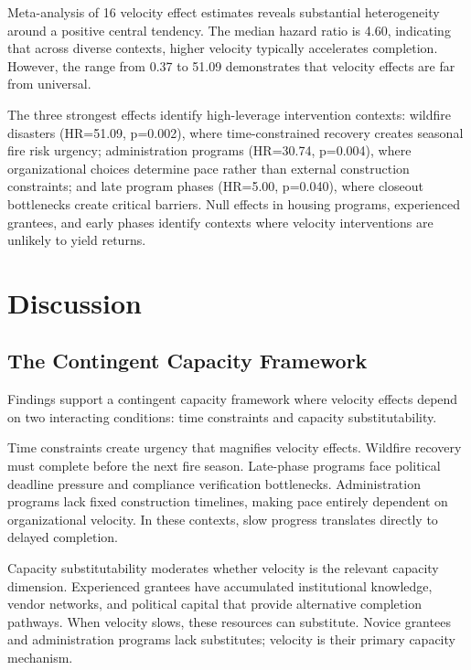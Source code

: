\documentclass[
  12pt,
  letterpaper,
]{article}
\begin{document}
Meta-analysis of 16 velocity effect estimates reveals substantial
heterogeneity around a positive central tendency. The median hazard
ratio is 4.60, indicating that across diverse contexts, higher velocity
typically accelerates completion. However, the range from 0.37 to 51.09
demonstrates that velocity effects are far from universal.

The three strongest effects identify high-leverage intervention
contexts: wildfire disasters (HR=51.09, p=0.002), where time-constrained
recovery creates seasonal fire risk urgency; administration programs
(HR=30.74, p=0.004), where organizational choices determine pace rather
than external construction constraints; and late program phases
(HR=5.00, p=0.040), where closeout bottlenecks create critical barriers.
Null effects in housing programs, experienced grantees, and early phases
identify contexts where velocity interventions are unlikely to yield
returns.

\section{Discussion}\label{discussion}

\subsection{The Contingent Capacity
Framework}\label{the-contingent-capacity-framework}

Findings support a contingent capacity framework where velocity effects
depend on two interacting conditions: time constraints and capacity
substitutability.

Time constraints create urgency that magnifies velocity effects.
Wildfire recovery must complete before the next fire season. Late-phase
programs face political deadline pressure and compliance verification
bottlenecks. Administration programs lack fixed construction timelines,
making pace entirely dependent on organizational velocity. In these
contexts, slow progress translates directly to delayed completion.

Capacity substitutability moderates whether velocity is the relevant
capacity dimension. Experienced grantees have accumulated institutional
knowledge, vendor networks, and political capital that provide
alternative completion pathways. When velocity slows, these resources
can substitute. Novice grantees and administration programs lack
substitutes; velocity is their primary capacity mechanism.
\end{document}
